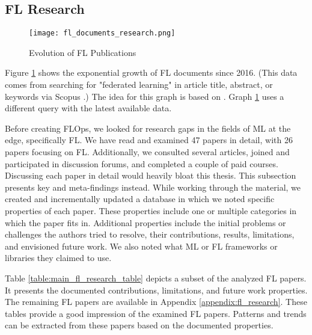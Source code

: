 \subsection{FL Research}\label{subsection:fl_research}

\begin{figure}[h]
    \centering
    \texttt{[image: fl\_documents\_research.png]}
    \caption{Evolution of FL Publications}
    \label{fig:fl_documents_research}
\end{figure}

Figure \ref{fig:fl_documents_research} shows the exponential growth of FL documents since 2016.
(This data comes from searching for "federated learning" in article title, abstract, or keywords via Scopus \cite{scopus_homepage}.)
The idea for this graph is based on \cite{thesis:tum_fl_framework_comparison}.
Graph \ref{fig:fl_documents_research} uses a different query with the latest available data.

Before creating FLOps, we looked for research gaps in the fields of ML at the edge, specifically FL.
We have read and examined 47 papers in detail, with 26 papers focusing on FL. 
Additionally, we consulted several articles, joined and participated in discussion forums, and completed a couple of paid courses.
Discussing each paper in detail would heavily bloat this thesis.
This subsection presents key and meta-findings instead.
While working through the material, we created and incrementally updated a database in which we noted specific properties of each paper.
These properties include one or multiple categories in which the paper fits in.
Additional properties include the initial problems or challenges the authors tried to resolve, their contributions, results, limitations, and envisioned future work.
We also noted what ML or FL frameworks or libraries they claimed to use.
\begin{figure}[p]
    
\end{figure}
Table \ref{table:main_fl_research_table} depicts a subset of the analyzed FL papers.
It presents the documented contributions, limitations, and future work properties.
The remaining FL papers are available in Appendix \ref{appendix:fl_research}.
These tables provide a good impression of the examined FL papers.
Patterns and trends can be extracted from these papers based on the documented properties.


